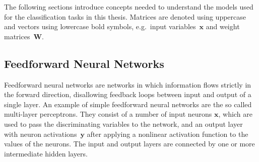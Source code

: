 The following sections introduce concepts needed to understand the models used
for the classification tasks in this thesis. Matrices are denoted using
uppercase and vectors using lowercase bold symbols, e.g.\ input
variables~$\mathbf{x}$ and weight matrices~$\mathbf{W}$.

\subsection{Feedforward Neural Networks}
\label{sec:nn_feedforward}
Feedforward neural networks are networks in which information flows strictly in
the forward direction, disallowing feedback loops between input and output of a
single layer. An example of simple feedforward neural networks are the so called
multi-layer perceptrons. They consist of a number of input neurons $\mathbf{x}$,
which are used to pass the discriminating variables to the network, and an
output layer with neuron activations~$\mathbf{y}$ after applying a nonlinear
activation function to the values of the neurons. The input and output layers
are connected by one or more intermediate hidden layers.
